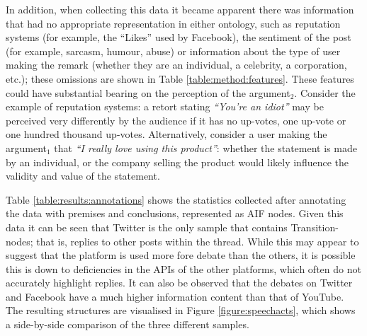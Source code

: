In addition, when collecting this data it became apparent there was information that had no appropriate representation in either ontology, such as reputation systems (for example, the ``Likes'' used by Facebook), the sentiment of the post (for example, sarcasm, humour, abuse) or information about the type of user making the remark (whether they are an individual, a celebrity, a corporation, etc.); these omissions are shown in Table \ref{table:method:features}. These features could have substantial bearing on the perception of the argument$_2$. Consider the example of reputation systems: a retort stating \textit{``You're an idiot''} may be perceived very differently by the audience if it has no up-votes, one up-vote or one hundred thousand up-votes. Alternatively, consider a user making the argument$_1$ that \textit{``I really love using this product''}: whether the statement is made by an individual, or the company selling the product would likely influence the validity and value of the statement.



Table \ref{table:results:annotations} shows the statistics collected after annotating the data with premises and conclusions, represented as AIF nodes. Given this data it can be seen that Twitter is the only sample that contains Transition-nodes; that is, replies to other posts within the thread. While this may appear to suggest that the platform is used more fore debate than the others, it is possible this is down to deficiencies in the APIs of the other platforms, which often do not accurately highlight replies. It can also be observed that the debates on Twitter and Facebook have a much higher information content than that of YouTube. The resulting structures are visualised in Figure \ref{figure:speechacts}, which shows a side-by-side comparison of the three different samples.

